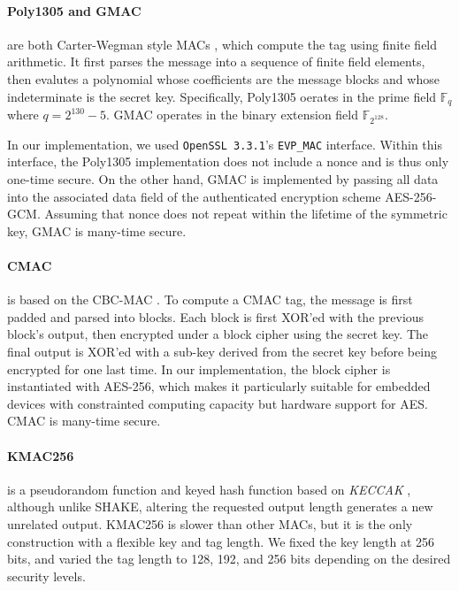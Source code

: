 \documentclass[runningheads]{llncs}
\begin{document}
\paragraph{Poly1305 \cite{DBLP:conf/fse/Bernstein05} and GMAC \cite{NIST80038D}} are both Carter-Wegman style MACs \cite{DBLP:journals/jcss/CarterW79,DBLP:journals/jcss/WegmanC81}, which compute the tag using finite field arithmetic. It first parses the message into a sequence of finite field elements, then evalutes a polynomial whose coefficients are the message blocks and whose indeterminate is the secret key. Specifically, Poly1305 oerates in the prime field $\mathbb{F}_q$ where $q = 2^{130} - 5$. GMAC operates in the binary extension field $\mathbb{F}_{2^{128}}$.

In our implementation, we used {\tt OpenSSL 3.3.1}'s \texttt{EVP\_MAC} interface. Within this interface, the Poly1305 implementation does not include a nonce and is thus only one-time secure. On the other hand, GMAC is implemented by passing all data into the associated data field of the authenticated encryption scheme AES-256-GCM. Assuming that nonce does not repeat within the lifetime of the symmetric key, GMAC is many-time secure.

\paragraph{CMAC \cite{NIST80038B}} is based on the CBC-MAC \cite{DBLP:conf/crypto/BlackR00}. To compute a CMAC tag, the message is first padded and parsed into blocks. Each block is first XOR'ed with the previous block's output, then encrypted under a block cipher using the secret key. The final output is XOR'ed with a sub-key derived from the secret key before being encrypted for one last time. In our implementation, the block cipher is instantiated with AES-256, which makes it particularly suitable for embedded devices with constrainted computing capacity but hardware support for AES. CMAC is many-time secure.

\paragraph{KMAC256 \cite{NIST800185}} is a pseudorandom function and keyed hash function based on \textit{KECCAK} \cite{NISTFIPS202}, although unlike SHAKE, altering the requested output length generates a new unrelated output. KMAC256 is slower than other MACs, but it is the only construction with a flexible key and tag length. We fixed the key length at 256 bits, and varied the tag length to 128, 192, and 256 bits depending on the desired security levels.
\end{document}
